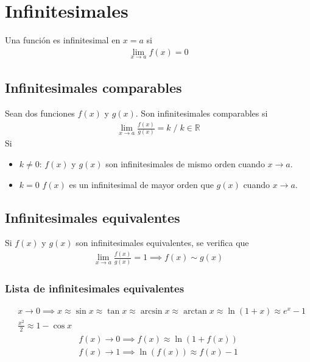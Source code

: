 \documentclass{article}
\begin{document}
\section{Infinitesimales}
Una función es infinitesimal en $x=a$ si
\begin{equation}
    \begin{split}
        \lim_{x \to a}f(x)=0
    \end{split}
\end{equation}
\subsection{Infinitesimales comparables}
Sean dos funciones $f(x)$ y $g(x)$. Son infinitesimales comparables si
\begin{equation}
    \begin{split}
        \lim_{x \to a} \frac{f(x)}{g(x)} = k\;/\;k \in \mathbb{R}
    \end{split}
\end{equation}
Si
\begin{itemize}
    \item $k \neq 0$: $f(x)$ y $g(x)$ son infinitesimales de mismo orden
    cuando $x \to a$.
    \item $k = 0$ $f(x)$ es un infinitesimal de mayor orden que $g(x)$
    cuando $x \to a$.
\end{itemize}
\subsection{Infinitesimales equivalentes}
Si $f(x)$ y $g(x)$ son infinitesimales equivalentes, se verifica que
\begin{equation}
    \begin{split}
        \lim_{x \to a} \frac{f(x)}{g(x)} = 1 \implies f(x) \sim g(x)
    \end{split}
\end{equation}
\subsubsection{Lista de infinitesimales equivalentes}
\begin{equation}
    \begin{split}
        &x \to 0 \implies x \approx \sin x \approx \tan x \approx \arcsin x \approx \arctan x \approx
        \ln (1+x) \approx e^x -1\\
        &\frac{x^{2}}{2} \approx 1- \cos x
    \end{split}
\end{equation}
\begin{equation}
    \begin{split}
        f(x) \to 0 \implies f(x) \approx \ln (1 + f(x))
    \end{split}
\end{equation}
\begin{equation}
    \begin{split}
        f(x) \to 1 \implies \ln(f(x)) \approx f(x)-1
    \end{split}
\end{equation}
\end{document}
